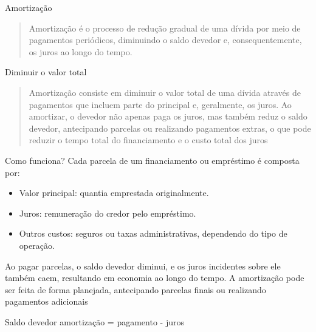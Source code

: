 \documentclass{if-beamer}
\begin{document}
	\begin{frame}[allowframebreaks]{Amortização}
		\begin{quote}
			Amortização é o processo de redução gradual de uma dívida por meio de pagamentos periódicos, diminuindo o 
			saldo devedor e, consequentemente, os juros ao longo do tempo.
		\end{quote}

	\framebreak
		\begin{block}{Diminuir o valor total}
			\begin{quote}
				Amortização consiste em diminuir o valor total de uma dívida através de pagamentos que incluem parte 
				do principal e, geralmente, os juros. Ao amortizar, o devedor não apenas paga os juros, mas também
				reduz o saldo devedor, antecipando parcelas ou realizando pagamentos extras, o que pode reduzir o 
				tempo total do financiamento e o custo total dos juros
			\end{quote}			
		\end{block}
	
	\framebreak
	
		\begin{block}{Como funciona?}
			Cada parcela de um financiamento ou empréstimo é composta por:
				\begin{itemize}
					\item Valor principal: quantia emprestada originalmente.
					\item Juros: remuneração do credor pelo empréstimo.
					\item Outros custos: seguros ou taxas administrativas, dependendo do tipo de operação. 			
				\end{itemize}
		\end{block}
		\begin{exampleblock}
			Ao pagar parcelas, o saldo devedor diminui, e os juros incidentes sobre ele também caem, resultando em
			economia ao longo do tempo. A amortização pode ser feita de forma planejada, antecipando parcelas finais
			ou realizando pagamentos adicionais 
		\end{exampleblock}
	
	\framebreak

		\begin{exampleblock}{Saldo devedor}
			amortização = pagamento - juros		
		\end{exampleblock}
	\end{frame}
\end{document}
